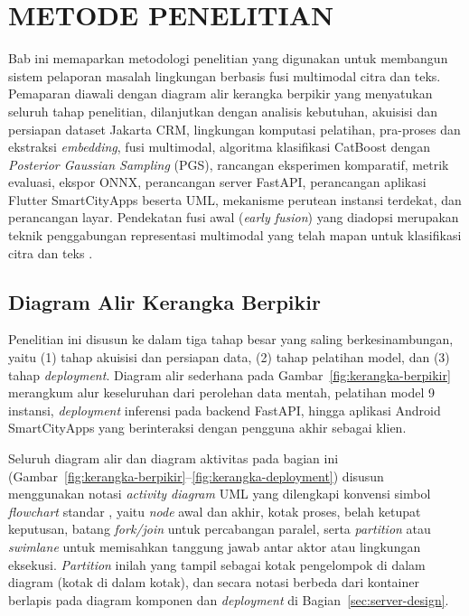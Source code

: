 \chapter{METODE PENELITIAN}
\label{ch:metode}

Bab ini memaparkan metodologi penelitian yang digunakan untuk membangun sistem pelaporan masalah lingkungan berbasis fusi multimodal citra dan teks. Pemaparan diawali dengan diagram alir kerangka berpikir yang menyatukan seluruh tahap penelitian, dilanjutkan dengan analisis kebutuhan, akuisisi dan persiapan dataset Jakarta CRM, lingkungan komputasi pelatihan, pra-proses dan ekstraksi \textit{embedding}, fusi multimodal, algoritma klasifikasi CatBoost dengan \textit{Posterior Gaussian Sampling} (PGS), rancangan eksperimen komparatif, metrik evaluasi, ekspor ONNX, perancangan server FastAPI, perancangan aplikasi Flutter SmartCityApps beserta UML, mekanisme perutean instansi terdekat, dan perancangan layar. Pendekatan fusi awal (\textit{early fusion}) yang diadopsi merupakan teknik penggabungan representasi multimodal yang telah mapan untuk klasifikasi citra dan teks \citep{baltrusaitisMultimodalSurvey2019,audebertMultimodalDoc2019}.

\section{Diagram Alir Kerangka Berpikir}
\label{sec:kerangka}

Penelitian ini disusun ke dalam tiga tahap besar yang saling berkesinambungan, yaitu (1) tahap akuisisi dan persiapan data, (2) tahap pelatihan model, dan (3) tahap \textit{deployment}. Diagram alir sederhana pada Gambar~\ref{fig:kerangka-berpikir} merangkum alur keseluruhan dari perolehan data mentah, pelatihan model 9 instansi, \textit{deployment} inferensi pada backend FastAPI, hingga aplikasi Android SmartCityApps yang berinteraksi dengan pengguna akhir sebagai klien.

Seluruh diagram alir dan diagram aktivitas pada bagian ini (Gambar~\ref{fig:kerangka-berpikir}--\ref{fig:kerangka-deployment}) disusun menggunakan notasi \textit{activity diagram} UML \citep{boochUML2005} yang dilengkapi konvensi simbol \textit{flowchart} standar \citep{iso5807}, yaitu \textit{node} awal dan akhir, kotak proses, belah ketupat keputusan, batang \textit{fork/join} untuk percabangan paralel, serta \textit{partition} atau \textit{swimlane} untuk memisahkan tanggung jawab antar aktor atau lingkungan eksekusi. \textit{Partition} inilah yang tampil sebagai kotak pengelompok di dalam diagram (kotak di dalam kotak), dan secara notasi berbeda dari kontainer berlapis pada diagram komponen dan \textit{deployment} di Bagian~\ref{sec:server-design}.

